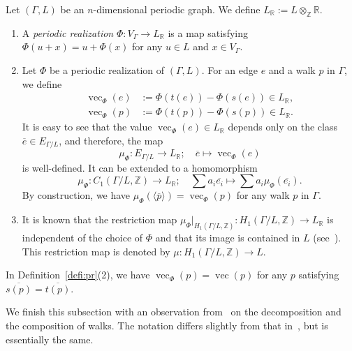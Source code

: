 \begin{defn}\label{defi:pr}
Let $(\Gamma,L)$ be an $n$-dimensional periodic graph.
We define $L_{\mathbb{R}} := L \otimes _{\mathbb{Z}} \mathbb{R}$. 
\begin{enumerate}
\item 
A \textit{periodic realization} $\Phi: V_{\Gamma} \to L_{\mathbb{R}}$ is a map satisfying
$\Phi(u+x) = u + \Phi(x)$ for any $u \in L$ and $x \in V _{\Gamma}$. 

\item 
Let $\Phi$ be a periodic realization of $(\Gamma, L)$. 
For an edge $e$ and a walk $p$ in $\Gamma$, we define 
\begin{align*}
\operatorname{vec}_{\Phi}(e) &:= \Phi(t(e)) - \Phi(s(e)) \in L_{\mathbb{R}}, \\
\operatorname{vec}_{\Phi}(p) &:= \Phi(t(p)) - \Phi(s(p)) \in L_{\mathbb{R}}. 
\end{align*}
It is easy to see that the value $\operatorname{vec}_{\Phi}(e) \in L_{\mathbb{R}}$ depends only on the class $\overline{e} \in E_{\Gamma /L}$, 
and therefore, 
the map 
\[
\mu _{\Phi} : E_{\Gamma /L} \to L_{\mathbb{R}};\quad \overline{e} \mapsto \operatorname{vec}_{\Phi}(e)
\]
is well-defined. 
It can be extended to a homomorphism 
\[
\mu _{\Phi}: C_1(\Gamma/L, \mathbb{Z}) \to L_{\mathbb{R}}; \quad 
\sum a_i \overline{e_i} \mapsto \sum a_i \mu _{\Phi} (\overline{e_i}). 
\]
By construction, we have $\mu _{\Phi} (\langle \overline{p} \rangle) = \operatorname{vec}_{\Phi}(p)$ for any walk $p$ in $\Gamma$. 

\item 
It is known that the restriction map $\mu _{\Phi} |_{H_1(\Gamma/L, \mathbb{Z})}: H_1(\Gamma/L, \mathbb{Z}) \to L_{\mathbb{R}}$ is independent of the choice of $\Phi$ and that its image is contained in $L$ (see~\cite[Lemma 2.7]{IN}). 
This restriction map is denoted by $\mu : H_1(\Gamma/L, \mathbb{Z}) \to L$. 
\end{enumerate}
\end{defn}

\begin{rmk}\label{rmk:finmap}
In Definition~\ref{defi:pr}(2), we have $\operatorname{vec}_{\Phi}(p) = \operatorname{vec}(p)$
for any $p$ satisfying $\overline{s(p)} = \overline{t(p)}$. 
\end{rmk}




We finish this subsection with an observation from~\cite{IN} on the decomposition and the composition of walks.
The notation differs slightly from that in~\cite{IN}, but is essentially the same.

